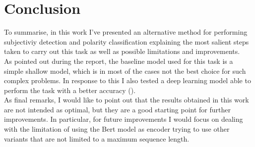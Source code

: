 \section{Conclusion}
\label{sec:end}
To summarise, in this work I've presented an alternative method for performing subjectiviy detection and polarity classification explaining the most salient steps taken to 
carry out this task as well as possible limitations and improvements.\\
As pointed out during the report, the baseline model used for this task is a simple shallow model, which is in most of the cases not the best choice for such complex problems. 
In response to this I also tested a deep learning model able to perform the task with a better accuracy (\textbf{}).\\
As final remarks, I would like to point out that the results obtained in this work are not intended as optimal, but they are a good starting point for further improvements. 
In particular, for future improvements I would focus on dealing with the limitation of using the Bert model as encoder trying to use other variants that are not limited to 
a maximum sequence length. 
